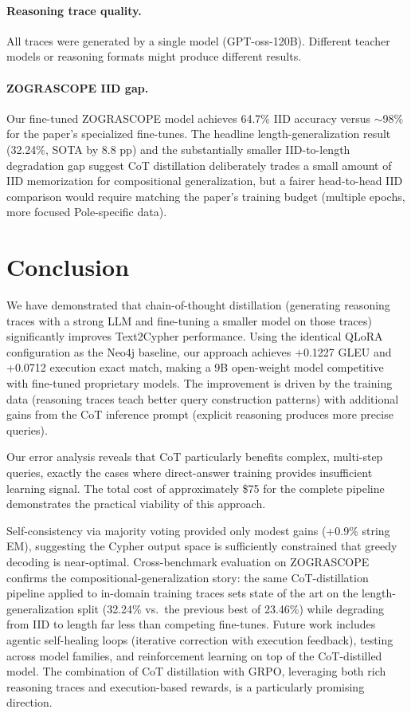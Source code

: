 \documentclass[11pt]{article}
\begin{document}
\paragraph{Reasoning trace quality.} All traces were generated by a single model (GPT-oss-120B). Different teacher models or reasoning formats might produce different results.

\paragraph{ZOGRASCOPE IID gap.} Our fine-tuned ZOGRASCOPE model achieves 64.7\% IID accuracy versus ${\sim}$98\% for the paper's specialized fine-tunes. The headline length-generalization result (32.24\%, SOTA by 8.8 pp) and the substantially smaller IID-to-length degradation gap suggest CoT distillation deliberately trades a small amount of IID memorization for compositional generalization, but a fairer head-to-head IID comparison would require matching the paper's training budget (multiple epochs, more focused Pole-specific data).

\section{Conclusion}

We have demonstrated that chain-of-thought distillation (generating reasoning traces with a strong LLM and fine-tuning a smaller model on those traces) significantly improves Text2Cypher performance. Using the identical QLoRA configuration as the Neo4j baseline, our approach achieves +0.1227 GLEU and +0.0712 execution exact match, making a 9B open-weight model competitive with fine-tuned proprietary models. The improvement is driven by the training data (reasoning traces teach better query construction patterns) with additional gains from the CoT inference prompt (explicit reasoning produces more precise queries).

Our error analysis reveals that CoT particularly benefits complex, multi-step queries, exactly the cases where direct-answer training provides insufficient learning signal. The total cost of approximately \$75 for the complete pipeline demonstrates the practical viability of this approach.

Self-consistency via majority voting provided only modest gains (+0.9\% string EM), suggesting the Cypher output space is sufficiently constrained that greedy decoding is near-optimal. Cross-benchmark evaluation on ZOGRASCOPE confirms the compositional-generalization story: the same CoT-distillation pipeline applied to in-domain training traces sets state of the art on the length-generalization split (32.24\% vs.\ the previous best of 23.46\%) while degrading from IID to length far less than competing fine-tunes. Future work includes agentic self-healing loops (iterative correction with execution feedback), testing across model families, and reinforcement learning on top of the CoT-distilled model. The combination of CoT distillation with GRPO, leveraging both rich reasoning traces and execution-based rewards, is a particularly promising direction.



\end{document}
